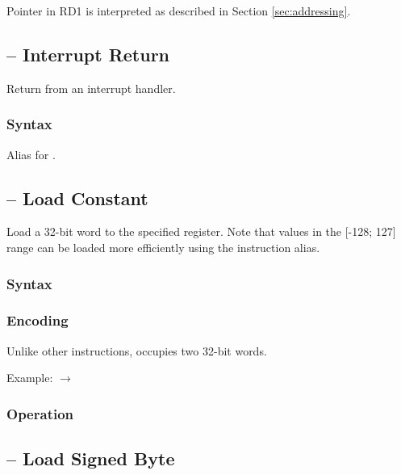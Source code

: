 \documentclass[a4paper,12pt,twoside,extrafontsizes]{memoir}
\begin{document}
{Pointer in RD1 is interpreted as described in Section \ref{sec:addressing}.

\subsection{ -- Interrupt Return}
\label{subsec:instr:iret}

Return from an interrupt handler.

\subsubsection{Syntax}


Alias for .

\subsection{ -- Load Constant}
\label{subsec:instr:lc}

Load a 32-bit word to the specified register. Note that values in the [-128; 127] range can be loaded more efficiently using the  instruction alias.

\subsubsection{Syntax}


\subsubsection{Encoding}


Unlike other instructions,  occupies two 32-bit words.

Example:  $\rightarrow$ 

\subsubsection{Operation}


\subsection{ -- Load Signed Byte}
\label{subsec:instr:lsb}

}
\end{document}
